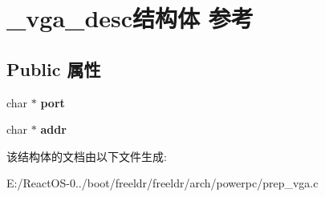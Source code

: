 \hypertarget{struct__vga__desc}{}\section{\+\_\+vga\+\_\+desc结构体 参考}
\label{struct__vga__desc}
\subsection*{Public 属性}
\begin{DoxyCompactItemize}
\item 
\mbox{\label{struct__vga__desc_afde23598d32654558bf2bf72d696eb01}} 
char $\ast$ {\bfseries port}
\item 
\mbox{\label{struct__vga__desc_af4010096767618ef42687e3daccf9a42}} 
char $\ast$ {\bfseries addr}
\end{DoxyCompactItemize}


该结构体的文档由以下文件生成\+:\begin{DoxyCompactItemize}
\item 
E\+:/\+React\+O\+S-\/0../boot/freeldr/freeldr/arch/powerpc/prep\+\_\+vga.\+c\end{DoxyCompactItemize}
